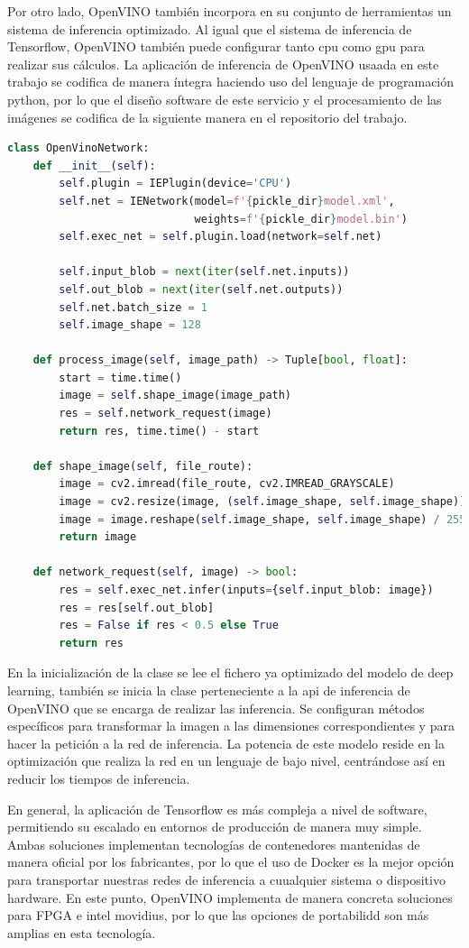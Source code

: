 Por otro lado, OpenVINO también incorpora en su conjunto de herramientas un sistema de inferencia optimizado.
Al igual que el sistema de inferencia de Tensorflow, OpenVINO también puede configurar tanto cpu como gpu para realizar sus cálculos.
La aplicación de inferencia de OpenVINO usaada en este trabajo se codifica de manera íntegra haciendo uso del lenguaje de programación python,
por lo que el diseño software de este servicio y el procesamiento de las imágenes se codifica de la siguiente manera en el repositorio del trabajo.

\begin{lstlisting}[caption=Clase de OpenVINO de la aplicación del trabajo.,
  label=b_label,
  language=python]
    class OpenVinoNetwork:
    def __init__(self):
        self.plugin = IEPlugin(device='CPU')
        self.net = IENetwork(model=f'{pickle_dir}model.xml',
                             weights=f'{pickle_dir}model.bin')
        self.exec_net = self.plugin.load(network=self.net)

        self.input_blob = next(iter(self.net.inputs))
        self.out_blob = next(iter(self.net.outputs))
        self.net.batch_size = 1
        self.image_shape = 128

    def process_image(self, image_path) -> Tuple[bool, float]:
        start = time.time()
        image = self.shape_image(image_path)
        res = self.network_request(image)
        return res, time.time() - start

    def shape_image(self, file_route):
        image = cv2.imread(file_route, cv2.IMREAD_GRAYSCALE)
        image = cv2.resize(image, (self.image_shape, self.image_shape))
        image = image.reshape(self.image_shape, self.image_shape) / 255.0
        return image

    def network_request(self, image) -> bool:
        res = self.exec_net.infer(inputs={self.input_blob: image})
        res = res[self.out_blob]
        res = False if res < 0.5 else True
        return res
\end{lstlisting}

En la inicialización de la clase se lee el fichero ya optimizado del modelo de deep learning, también se inicia la clase
perteneciente a la api de inferencia de OpenVINO que se encarga de realizar las inferencia.
Se configuran métodos específicos para transformar la imagen a las dimensiones correspondientes y para hacer la petición a la red de inferencia.
La potencia de este modelo reside en la optimización que realiza la red en un lenguaje de bajo nivel, centrándose así en reducir los tiempos de inferencia.

En general, la aplicación de Tensorflow es más compleja a nivel de software, permitiendo su escalado en entornos de producción de manera muy simple.
Ambas soluciones implementan tecnologías de contenedores mantenidas de manera oficial por los fabricantes, por lo que el uso de Docker es la mejor opción para transportar
nuestras redes de inferencia a cuualquier sistema o dispositivo hardware.
En este punto, OpenVINO implementa de manera concreta soluciones para FPGA e intel movidius, por lo que las opciones de portabilidd son más amplias en esta tecnología.


